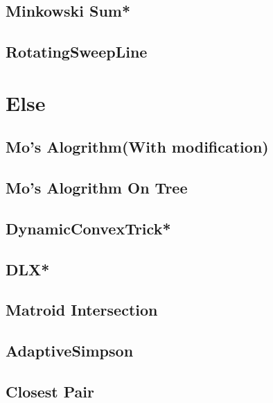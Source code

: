 \subsection{Minkowski Sum*} %

\subsection{RotatingSweepLine}


\section{Else}
\subsection{Mo's Alogrithm(With modification)}

\subsection{Mo's Alogrithm On Tree}

\subsection{DynamicConvexTrick*} %

\subsection{DLX*} %

\subsection{Matroid Intersection}

\subsection{AdaptiveSimpson}

\subsection{Closest Pair}

